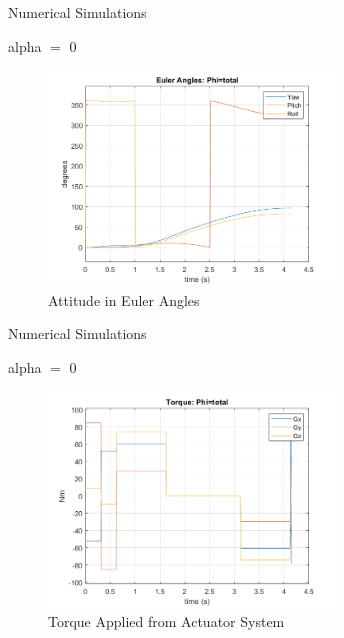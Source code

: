 \documentclass{beamer}
\begin{document}
\begin{frame}{Numerical Simulations}
	\begin{block}{alpha $=$ 0}
		
		\begin{figure}[H]
			\label{fig:euler_ang_phi_total_alpha0}
			\begin{center}
				\includegraphics[width=3in]{figures/alpha0/euler_angles.png}
			\end{center}
			\caption{Attitude in Euler Angles}
		\end{figure}
		
	\end{block}
\end{frame}
\begin{frame}{Numerical Simulations}
	\begin{block}{alpha $=$ 0}
		
		\begin{figure}[H]
			\label{fig:torque_total_alpha0}
			\begin{center}
				\includegraphics[width=3in]{figures/alpha0/torque.png}
			\end{center}
			\caption{Torque Applied from Actuator System}
		\end{figure}
		
	\end{block}
\end{frame}
\end{document}
